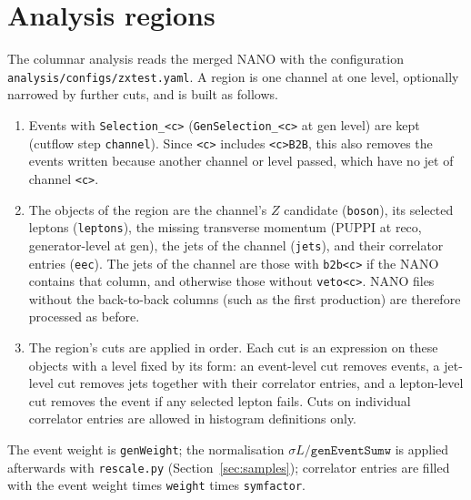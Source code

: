 \documentclass[11pt]{article}
\newcommand{\code}[1]{\texttt{#1}}
\begin{document}
\begin{landscape}
\begin{table}[htbp]
\centering
\caption{As Table~\ref{tab:cutflow}, for the $gg\to ZH$ samples (\code{ggZH\_Hto2B\_Zto2L}, \code{ggZH\_Hto2C\_Zto2L},
\code{ggZH\_Hto2Glu\_Zto2L}, \code{GluGluZH\_Zto2L\_Hto2Wto4Q}, \code{GluGluZH\_Zto2L\_Hto2WtoLNu2Q}).}
\label{tab:cutflowZH}
\scriptsize
\setlength{\tabcolsep}{3pt}

\end{table}
\end{landscape}

\section{Analysis regions}
\label{sec:regions}

The columnar analysis reads the merged NANO with the configuration \code{analysis/configs/zxtest.yaml}. A region is one
channel at one level, optionally narrowed by further cuts, and is built as follows.
\begin{enumerate}
\item Events with \code{Selection\_<c>} (\code{GenSelection\_<c>} at gen level) are kept (cutflow step
  \code{channel}). Since \code{<c>} includes \code{<c>B2B}, this also removes the events written because another
  channel or level passed, which have no jet of channel \code{<c>}.
\item The objects of the region are the channel's $Z$ candidate (\code{boson}), its selected leptons (\code{leptons}),
  the missing transverse momentum (PUPPI at reco, generator-level at gen), the jets of the channel (\code{jets}), and
  their correlator entries (\code{eec}). The jets of the channel are those with \code{b2b<c>} if the NANO contains
  that column, and otherwise those without \code{veto<c>}. NANO files without the back-to-back columns (such as the
  first production) are therefore processed as before.
\item The region's cuts are applied in order. Each cut is an expression on these objects with a level fixed by its
  form: an event-level cut removes events, a jet-level cut removes jets together with their correlator entries, and a
  lepton-level cut removes the event if any selected lepton fails. Cuts on individual correlator entries are allowed in
  histogram definitions only.
\end{enumerate}
The event weight is \code{genWeight}; the normalisation $\sigma L/\code{genEventSumw}$ is applied afterwards with
\code{rescale.py} (Section~\ref{sec:samples});
correlator entries are filled with the event weight times \code{weight} times \code{symfactor}.
\end{document}

